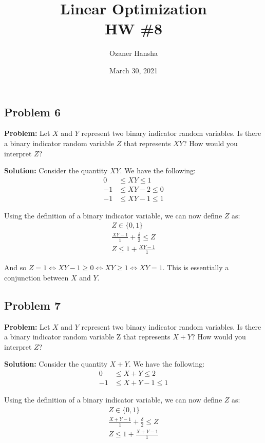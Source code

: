 \documentclass{article}
\begin{document}
\title{Linear Optimization\\HW \#8}
\author{Ozaner Hansha}
\date{March 30, 2021}
\maketitle

\subsection*{Problem 6}
\noindent\textbf{Problem:} Let $X$ and $Y$ represent two binary indicator random variables. Is there a binary indicator random variable $Z$ that represents $XY$? How would you interpret $Z$?
\bigskip

\noindent\textbf{Solution:} Consider the quantity $XY$. We have the following:
\begin{align*}
    0&\le XY\le1\\
    -1&\le XY-2\le0\\
    -1&\le XY-1\le1
\end{align*}

Using the definition of a binary indicator variable, we can now define $Z$ as:
\begin{align*}
    Z\in\{0,1\}\\
    \frac{XY-1}{1}+\frac{\delta}{2}\le Z\\
    Z\le 1+\frac{XY-1}{1}
\end{align*}

And so $Z=1\iff XY-1\ge 0\iff XY\ge 1\iff XY=1$. This is essentially a conjunction between $X$ and $Y$.

\subsection*{Problem 7}
\noindent\textbf{Problem:} Let $X$ and $Y$ represent two binary indicator random variables. Is there a binary indicator random variable Z that represents $X+Y$? How would you interpret $Z$?
\bigskip

\noindent\textbf{Solution:} Consider the quantity $X+Y$. We have the following:
\begin{align*}
    0&\le X+Y\le2\\
    -1&\le X+Y-1\le1
\end{align*}

Using the definition of a binary indicator variable, we can now define $Z$ as:
\begin{align*}
    Z\in\{0,1\}\\
    \frac{X+Y-1}{1}+\frac{\delta}{2}\le Z\\
    Z\le 1+\frac{X+Y-1}{1}
\end{align*}
\end{document}
